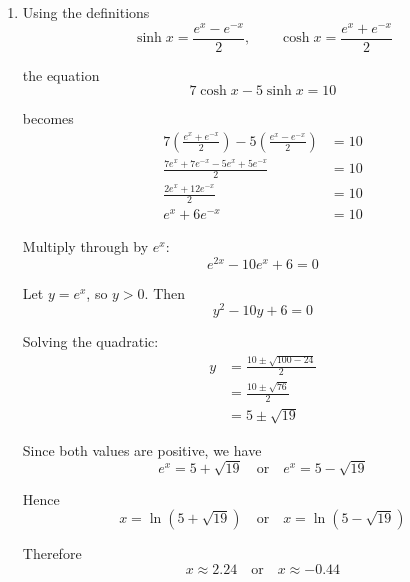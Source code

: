 \documentclass[leqno]{article}
\begin{document}
\begin{enumerate}[
  label=\textbf{\arabic*.},
  leftmargin=*,
  topsep=0pt,
  partopsep=0pt,
  parsep=0pt
]
\begin{djsSolution}
\begin{enumerate}[label=\textbf{(\alph*)}]
  So
  \begin{align*}
  x&=\ln(\sqrt6)\pm \ln\left(\frac{5+\sqrt{19}}{\sqrt6}\right)\\
  &=\ln(5+\sqrt{19})
  \quad \text{or} \quad
  \ln\left(\frac{6}{5+\sqrt{19}}\right)
  \end{align*}

  Rationalising:
  \[
  \frac{6}{5+\sqrt{19}}=5-\sqrt{19}
  \]

  so
  \[
  x=\ln(5+\sqrt{19})
  \quad \text{or} \quad
  x=\ln(5-\sqrt{19})
  \]
  
  Therefore the solutions are
  \[
  x\approx 2.24 \quad \text{or} \quad x\approx -0.44\qquad\text{(2 d.p.)}
  \]

  \item Using the definitions
  \[
  \sinh x=\frac{e^x-e^{-x}}{2},
  \qquad
  \cosh x=\frac{e^x+e^{-x}}{2}
  \]

  the equation
  \[
  7\cosh x-5\sinh x=10
  \]

  becomes
  \begin{align*}
  7\left(\frac{e^x+e^{-x}}{2}\right)-5\left(\frac{e^x-e^{-x}}{2}\right)&=10\\
  \frac{7e^x+7e^{-x}-5e^x+5e^{-x}}{2}&=10\\
  \frac{2e^x+12e^{-x}}{2}&=10\\
  e^x+6e^{-x}&=10
  \end{align*}
  
  Multiply through by \(e^x\):
  \[
  e^{2x}-10e^x+6=0
  \]
  
  Let \(y=e^x\), so \(y>0\). Then
  \[
  y^2-10y+6=0
  \]

  Solving the quadratic:
  \begin{align*}
  y&=\frac{10\pm\sqrt{100-24}}{2}\\
  &=\frac{10\pm\sqrt{76}}{2}\\
  &=5\pm\sqrt{19}
  \end{align*}
  
  Since both values are positive, we have
  \[
  e^x=5+\sqrt{19}
  \quad \text{or} \quad
  e^x=5-\sqrt{19}
  \]

  Hence
  \[
  x=\ln(5+\sqrt{19})
  \quad \text{or} \quad
  x=\ln(5-\sqrt{19})
  \]
  
  Therefore
  \[
  x\approx 2.24 \quad \text{or} \quad x\approx -0.44
  \]
\end{enumerate}
\end{djsSolution}


\newpage

\questionitem


\end{enumerate}
\end{document}
